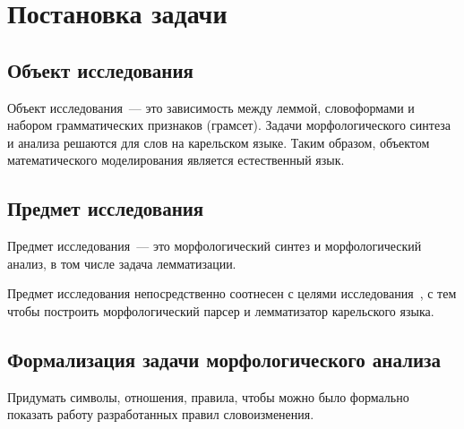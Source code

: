 \chapter{Постановка задачи} \label{chapt_problem_formulation}

\section{Объект исследования} \label{sect_problem_obj}

Объект исследования~--- это зависимость между леммой, словоформами 
и набором грамматических признаков (грамсет).
Задачи морфологического синтеза и анализа решаются для слов на карельском языке.
Таким образом, объектом математического моделирования 
является естественный язык. 


\section{Предмет исследования} \label{sect_predmet_obj}

Предмет исследования~--- это морфологический синтез и морфологический анализ, 
в том числе задача лемматизации. 

Предмет исследования непосредственно соотнесен 
с целями исследования~\cite{Martishina2001Object}, 
с тем чтобы построить морфологический парсер и лемматизатор карельского языка. 

\section{Формализация задачи морфологического анализа} \label{sect_formal}

Придумать символы, отношения, правила, чтобы можно было формально показать работу 
разработанных правил словоизменения.

